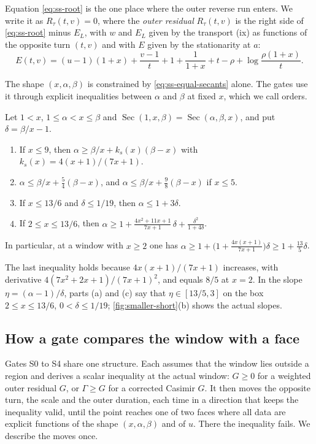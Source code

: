 Equation \eqref{eq:ss-root} is the one place where the outer reverse run enters. We write it as
$R_\tau(t,v)=0$, where the \emph{outer residual} $R_\tau(t,v)$ is the
right side of \eqref{eq:ss-root} minus $E_L$, with $w$ and $E_L$ given by the transport (ix) as
functions of the opposite turn $(t,v)$ and with $E$ given by the stationarity at $a$:
\begin{equation}\label{eq:ss-E}
  E(t,v)=(u-1)(1+x)+\frac{v-1}{t}+1+\frac{1}{1+x}+t-\rho+\log\frac{\rho(1+x)}{t}.
\end{equation}

The shape $(x,\alpha,\beta)$ is constrained by \eqref{eq:ss-equal-secants} alone. The gates use
it through explicit inequalities between $\alpha$ and $\beta$ at fixed $x$, which we call orders.

\begin{lemma}\label{lem:ss-orders}
Let $1<x$, $1\le\alpha<x\le\beta$ and $\operatorname{Sec}(1,x,\beta)=\operatorname{Sec}(\alpha,
\beta,x)$, and put $\delta=\beta/x-1$.
\begin{enumerate}[label=(\alph*)]
\item If $x\le9$, then $\alpha\ge\beta/x+k_s(x)(\beta-x)$ with $k_s(x)=4(x+1)/(7x+1)$.
\item $\alpha\le\beta/x+\frac54(\beta-x)$, and $\alpha\le\beta/x+\frac98(\beta-x)$ if $x\le5$.
\item If $x\le13/6$ and $\delta\le1/19$, then $\alpha\le1+3\delta$.
\item If $2\le x\le13/6$, then
  $\alpha\ge1+\frac{4x^2+11x+1}{7x+1}\,\delta+\frac{\delta^2}{1+4\delta}$.
\end{enumerate}
In particular, at a window with $x\ge2$ one has $\alpha\ge1+\bigl(1+\frac{4x(x+1)}{7x+1}\bigr)
\delta\ge1+\frac{13}{5}\delta$.
\end{lemma}

The last inequality holds because $4x(x+1)/(7x+1)$ increases, with derivative
$4(7x^2+2x+1)/(7x+1)^2$, and equals $8/5$ at $x=2$. In the slope $\eta=(\alpha-1)/\delta$, parts
(a) and (c) say that $\eta\in[13/5,3]$ on the box $2\le x\le13/6$, $0<\delta\le1/19$;
\cref{fig:smaller-short}(b) shows the actual slopes.

\subsection{How a gate compares the window with a face}\label{sec:ss-machinery}

Gates S0 to S4 share one structure. Each assumes that the window lies outside a region and
derives a scalar inequality at the actual window: $G\ge0$ for a weighted outer residual $G$, or
$\Gamma\ge G$ for a corrected Casimir $G$. It then moves the opposite turn, the scale and the outer
duration, each time in a direction that keeps the inequality valid, until the point reaches one of
two faces where all data are explicit functions of the shape $(x,\alpha,
\beta)$ and of $u$. There the inequality fails. We describe the moves once.

